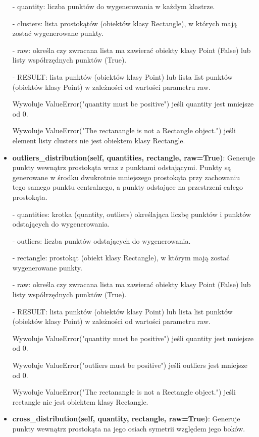 \documentclass{lab}
\begin{document}
\begin{itemize}
  - quantity: liczba punktów do wygenerowania w każdym klastrze.

  - clusters: lista prostokątów (obiektów klasy Rectangle), w których mają zostać wygenerowane punkty.

  - raw: określa czy zwracana lista ma zawierać obiekty klasy Point (False) lub listy współrzędnych punktów (True).

  - RESULT: lista punktów (obiektów klasy Point) lub lista list punktów (obiektów klasy Point) w zależności od wartości parametru raw.

  Wywołuje ValueError("quantity must be positive") jeśli quantity jest mniejsze od 0.

  Wywołuje ValueError("The rectanangle is not a Rectangle object.") jeśli element listy clusters nie jest obiektem klasy Rectangle.

  \item \textbf{outliers\_distribution(self, quantities, rectangle, raw=True)}:
  Generuje punkty wewnątrz prostokąta wraz z punktami odstającymi. Punkty są generowane w środku dwukrotnie mniejszego prostokąta przy zachowaniu tego samego punktu centralnego, a punkty odstające na przestrzeni całego prostokąta.

  - quantities: krotka (quantity, outliers) określająca liczbę punktów i punktów odstających do wygenerowania.

  - outliers: liczba punktów odstających do wygenerowania.

  - rectangle: prostokąt (obiekt klasy Rectangle), w którym mają zostać wygenerowane punkty.

  - raw: określa czy zwracana lista ma zawierać obiekty klasy Point (False) lub listy współrzędnych punktów (True).

  - RESULT: lista punktów (obiektów klasy Point) lub lista list punktów (obiektów klasy Point) w zależności od wartości parametru raw.

  Wywołuje ValueError("quantity must be positive") jeśli quantity jest mniejsze od 0.

  Wywołuje ValueError("outliers must be positive") jeśli outliers jest mniejsze od 0.

  Wywołuje ValueError("The rectanangle is not a Rectangle object.") jeśli rectangle nie jest obiektem klasy Rectangle.

  \item \textbf{cross\_distribution(self, quantity, rectangle, raw=True)}:
  Generuje punkty wewnątrz prostokąta na jego osiach symetrii względem jego boków.


\end{itemize}
\end{document}
